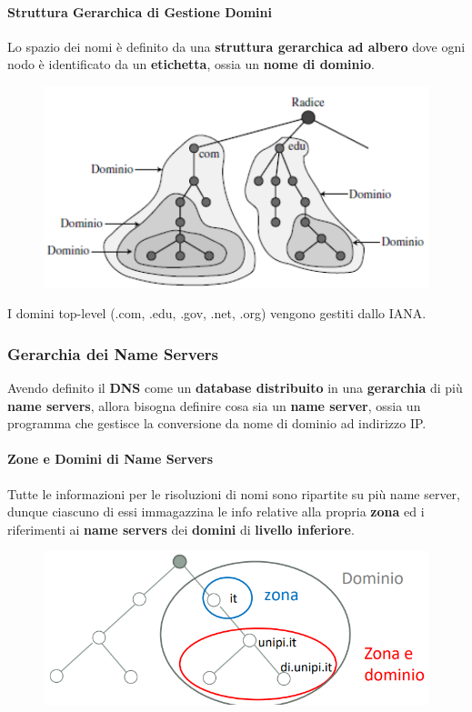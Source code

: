 \documentclass{article}
\begin{document}
\paragraph{Struttura Gerarchica di Gestione Domini} Lo spazio dei nomi è definito da una \textbf{struttura gerarchica ad albero} dove ogni nodo è identificato da un \textbf{etichetta}, ossia un \textbf{nome di dominio}.

\begin{figure}[htbp]
    \center
    \includegraphics[scale=0.5]{img/DNS1.png}
\end{figure}

I domini top-level (.com, .edu, .gov, .net, .org) vengono gestiti dallo IANA.

\subsubsection{Gerarchia dei Name Servers}

Avendo definito il \textbf{DNS} come un \textbf{database distribuito} in una \textbf{gerarchia} di più \textbf{name servers}, allora bisogna definire cosa sia un \textbf{name server}, ossia un 
programma che gestisce la conversione da nome di dominio ad indirizzo IP.

\paragraph{Zone e Domini di Name Servers} Tutte le informazioni per le risoluzioni di nomi sono ripartite su più name server, dunque ciascuno di essi immagazzina le info relative alla propria \textbf{zona} ed i riferimenti ai \textbf{name servers} dei \textbf{domini} di \textbf{livello inferiore}.

\vspace*{10px}

\begin{figure}[htbp]
    \center
    \includegraphics[scale=0.5]{img/DNS2.png}
\end{figure}
\end{document}

